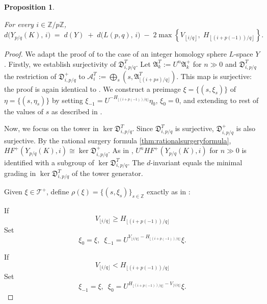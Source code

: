 \documentclass[12pt]{amsart}
\newtheorem{proposition}[theorem]{Proposition}
\theoremstyle{definition}
\theoremstyle{definition}
\newcommand{\Z}{{\mathbb{Z}}}
\newcommand{\HF}{HF}
\newcommand{\din}{d}
\begin{document}
\begin{proposition}\label{prop:UB}

For every $i \in \Z/p\Z$,
\begin{equation}\label{eq:UB}
\din\big(Y_{p/q}(K),\, i\big) \;=\;
\din(Y) \;+\; \din\big(L(p,q),\, i\big)
\;-\; 2\max\!\left\{V_{\left\lfloor i/q \right\rfloor},\;
H_{\left\lfloor (i+p(-1))/q \right\rfloor}\right\}.
\end{equation}


\end{proposition}

\begin{proof}

We adapt the proof of \cite[Proposition~1.6]{NiWu} to the case of an integer homology sphere $L$-space $Y$. Firstly, we establish surjectivity of $\mathfrak{D}^T_{i,p/q}$. Let $\mathfrak{A}_k^T := U^n \mathfrak{A}_k^+$ for $n \gg 0$ and
$\mathfrak{D}^T_{i,p/q}$ the restriction of
$\mathfrak{D}^+_{i,p/q}$ to
$\mathcal{A}_i^T := \bigoplus_s (s, \mathfrak{A}^T_{\lfloor(i+ps)/q\rfloor})$.
This map is surjective: the proof is again identical to
\cite[Lemma~2.8]{NiWu}. We construct a preimage $\xi = \{(s,\xi_s) \}$ of $\eta = \{(s,\eta_s)\}$ by setting
$\xi_{-1} = U^{-H_{\lfloor(i+p(-1))/q\rfloor}} \eta_0$, $\xi_0 = 0$,
and extending to rest of the values of $s$ as described in \cite[Lemma~2.8]{NiWu}.

\medskip
Now, we focus on the tower in $\ker \mathfrak{D}^T_{i,p/q}$. Since $\mathfrak{D}^T_{i,p/q}$ is surjective,
$\mathfrak{D}^+_{i,p/q}$ is also surjective.  By the rational surgery formula
\ref{thm:rationalsurgeryformula}, $\HF^+(Y_{p/q}(K),i) \cong \ker \mathfrak{D}^+_{i,p/q}$.
As in \cite[Lemma~2.9]{NiWu}, $U^n \HF^+(Y_{p/q}(K),i)$ for $n \gg 0$
is identified with a subgroup of $\ker \mathfrak{D}^T_{i,p/q}$.
The $d$-invariant equals the minimal grading in $\ker \mathfrak{D}^T_{i,p/q}$ of the tower generator.
\medskip

Given $\xi \in \mathcal{T}^+$, define
$\rho(\xi) = \{(s,\xi_s)\}_{s \in \Z}$ exactly as in \cite{NiWu}:

\smallskip\noindent

If \[V_{\lfloor i/q \rfloor} \geq H_{\lfloor (i+p(-1))/q \rfloor}\]
Set \[\xi_0 = \xi, \;\
\xi_{-1} = U^{V_{\lfloor i/q\rfloor} - H_{\lfloor(i+p(-1))/q\rfloor}} \xi.\]

\smallskip\noindent
If
\[V_{\lfloor i/q \rfloor} < H_{\lfloor (i+p(-1))/q \rfloor}\]
Set \[\xi_{-1} = \xi, \;\
\xi_0 = U^{H_{\lfloor(i+p(-1))/q\rfloor} - V_{\lfloor i/q \rfloor}} \xi.\]


\end{proof}
\end{document}
